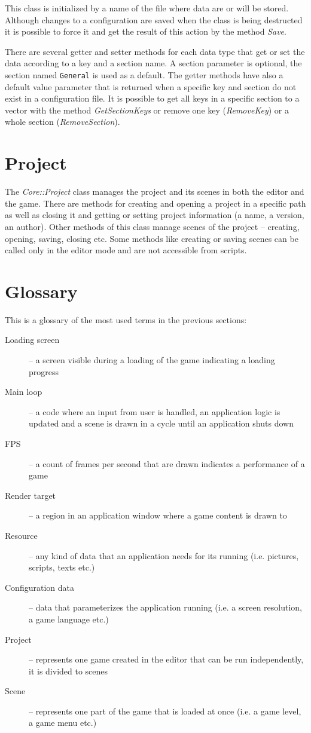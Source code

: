 \documentclass[a4paper, 12pt]{report}
\begin{document}
This class is initialized by a name of the file where data are or will be stored. Although changes to a configuration are saved when the class is being destructed it is possible to force it and get the result of this action by the method \emph{Save}.

There are several getter and setter methods for each data type that get or set the data according to a key and a section name. A section parameter is optional, the section named \verb|General| is used as a default. The getter methods have also a default value parameter that is returned when a specific key and section do not exist in a configuration file. It is possible to get all keys in a specific section to a vector with the method \emph{GetSectionKeys} or remove one key (\emph{RemoveKey}) or a whole section (\emph{RemoveSection}).

\section{Project}

The \emph{Core::Project} class manages the project and its scenes in both the editor and the game. There are methods for creating and opening a project in a specific path as well as closing it and getting or setting project information (a name, a version, an author). Other methods of this class manage scenes of the project -- creating, opening, saving, closing etc. Some methods like creating or saving scenes can be called only in the editor mode and are not accessible from scripts.

\section{Glossary}
This is a glossary of the most used terms in the previous sections:

\begin{description}
  \item[Loading screen] -- a screen visible during a loading of the game indicating a loading progress
  \item[Main loop] -- a code where an input from user is handled, an application logic is updated and a scene is drawn in a cycle until an application shuts down
  \item[FPS] -- a count of frames per second that are drawn indicates a performance of a game
  \item[Render target] -- a region in an application window where a game content is drawn to
  \item[Resource] -- any kind of data that an application needs for its running (i.e. pictures, scripts, texts etc.)
  \item[Configuration data] -- data that parameterizes the application running (i.e. a screen resolution, a game language etc.)
  \item[Project] -- represents one game created in the editor that can be run independently, it is divided to scenes
  \item[Scene] -- represents one part of the game that is loaded at once (i.e. a game level, a game menu etc.)
\end{description}
\end{document}
